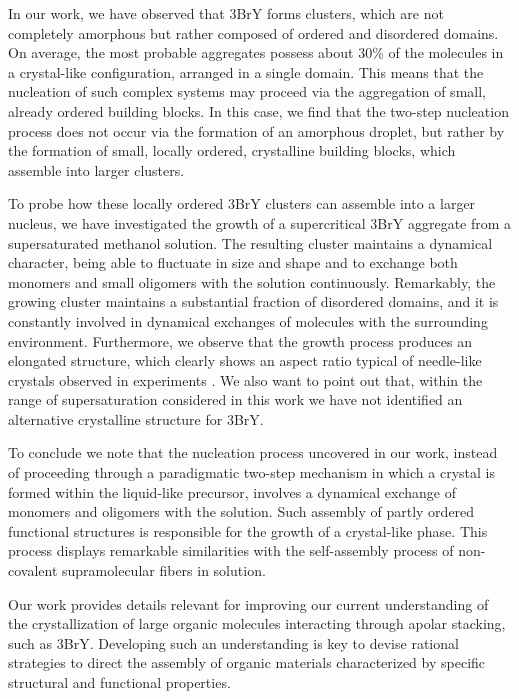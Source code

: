 \documentclass[journal=cgdefu,manuscript=article,layout=twocolumn]{achemso}
\begin{document}
In our work, we have observed that 3BrY forms clusters, which are not completely amorphous but rather composed of ordered and disordered domains. On average, the most probable aggregates possess about 30\% of the molecules in a crystal-like configuration, arranged in a single domain. This means that the nucleation of such complex systems may proceed via the aggregation of small, already ordered building blocks. In this case, we find that the two-step nucleation process does not occur via the formation of an 
amorphous droplet, but rather by the formation of small, locally ordered, crystalline building 
blocks, which assemble into larger clusters.

To probe how these locally ordered 3BrY clusters can assemble into a larger nucleus, we have 
investigated the growth of a supercritical 3BrY aggregate from a supersaturated methanol solution.
The resulting cluster maintains a dynamical character, being able to fluctuate in size and shape and to exchange both monomers and small oligomers with the solution continuously.  
Remarkably, the growing cluster maintains a substantial fraction of disordered domains, and it is constantly involved in dynamical exchanges of molecules with the surrounding environment. Furthermore, we observe that the growth process produces an elongated structure, which clearly shows an aspect ratio typical of needle-like crystals observed in experiments \cite{harano2012heterogeneous}. We also want to point out that, within the range of supersaturation considered in this work we have not identified an alternative crystalline structure for 3BrY.

To conclude we note that the nucleation process uncovered in our work, instead of proceeding through a paradigmatic two-step mechanism in which a crystal is formed within the liquid-like precursor, involves a dynamical exchange of monomers and oligomers with the solution. Such assembly of partly ordered functional structures is responsible for the growth of a crystal-like phase. This process displays remarkable similarities with the self-assembly process of non-covalent supramolecular fibers in solution\cite{Albertazzi2014}. 
 
Our work provides details relevant for improving our current understanding of the crystallization of large organic molecules interacting through apolar stacking, such as 3BrY. Developing such an understanding is key to devise rational strategies to direct the assembly of organic materials characterized by specific structural and functional properties.   
\end{document}

